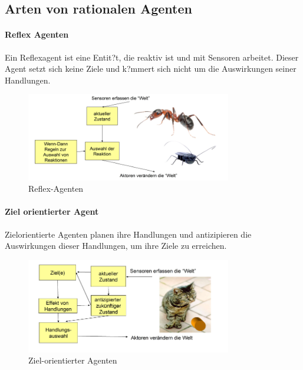 \subsection{Arten von rationalen Agenten}

\paragraph{Reflex Agenten}

Ein Reflexagent ist eine Entit?t, die reaktiv ist und mit Sensoren arbeitet. Dieser Agent setzt sich keine Ziele und k?mmert sich nicht um die Auswirkungen seiner Handlungen.

\begin{figure}[H]
    \centering
    \includegraphics[width=0.8\textwidth]{figures/reflex-agent.png}
    \caption{Reflex-Agenten}
    \label{fig:reflex-agent}
\end{figure}

\paragraph{Ziel orientierter Agent}

Zielorientierte Agenten planen ihre Handlungen und antizipieren die Auswirkungen dieser Handlungen, um ihre Ziele zu erreichen.

\begin{figure}[H]
    \centering
    \includegraphics[width=0.8\textwidth]{figures/goal-oriented-agents.png}
    \caption{Ziel-orientierter Agenten}
    \label{fig:ziel-orientierter-agent}
\end{figure}

